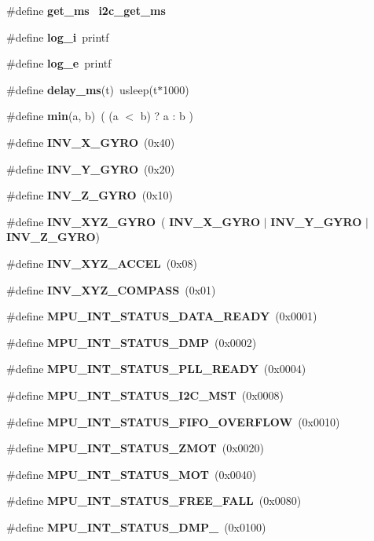 \begin{DoxyCompactItemize}
\item 
\#define \textbf{ get\+\_\+ms}~\textbf{ i2c\+\_\+get\+\_\+ms}
\item 
\#define \textbf{ log\+\_\+i}~printf
\item 
\#define \textbf{ log\+\_\+e}~printf
\item 
\#define \textbf{ delay\+\_\+ms}(t)~usleep(t$\ast$1000)
\item 
\#define \textbf{ min}(a,  b)~( (a $<$ b) ? a \+: b )
\item 
\#define \textbf{ I\+N\+V\+\_\+\+X\+\_\+\+G\+Y\+RO}~(0x40)
\item 
\#define \textbf{ I\+N\+V\+\_\+\+Y\+\_\+\+G\+Y\+RO}~(0x20)
\item 
\#define \textbf{ I\+N\+V\+\_\+\+Z\+\_\+\+G\+Y\+RO}~(0x10)
\item 
\#define \textbf{ I\+N\+V\+\_\+\+X\+Y\+Z\+\_\+\+G\+Y\+RO}~(\textbf{ I\+N\+V\+\_\+\+X\+\_\+\+G\+Y\+RO} $\vert$ \textbf{ I\+N\+V\+\_\+\+Y\+\_\+\+G\+Y\+RO} $\vert$ \textbf{ I\+N\+V\+\_\+\+Z\+\_\+\+G\+Y\+RO})
\item 
\#define \textbf{ I\+N\+V\+\_\+\+X\+Y\+Z\+\_\+\+A\+C\+C\+EL}~(0x08)
\item 
\#define \textbf{ I\+N\+V\+\_\+\+X\+Y\+Z\+\_\+\+C\+O\+M\+P\+A\+SS}~(0x01)
\item 
\#define \textbf{ M\+P\+U\+\_\+\+I\+N\+T\+\_\+\+S\+T\+A\+T\+U\+S\+\_\+\+D\+A\+T\+A\+\_\+\+R\+E\+A\+DY}~(0x0001)
\item 
\#define \textbf{ M\+P\+U\+\_\+\+I\+N\+T\+\_\+\+S\+T\+A\+T\+U\+S\+\_\+\+D\+MP}~(0x0002)
\item 
\#define \textbf{ M\+P\+U\+\_\+\+I\+N\+T\+\_\+\+S\+T\+A\+T\+U\+S\+\_\+\+P\+L\+L\+\_\+\+R\+E\+A\+DY}~(0x0004)
\item 
\#define \textbf{ M\+P\+U\+\_\+\+I\+N\+T\+\_\+\+S\+T\+A\+T\+U\+S\+\_\+\+I2\+C\+\_\+\+M\+ST}~(0x0008)
\item 
\#define \textbf{ M\+P\+U\+\_\+\+I\+N\+T\+\_\+\+S\+T\+A\+T\+U\+S\+\_\+\+F\+I\+F\+O\+\_\+\+O\+V\+E\+R\+F\+L\+OW}~(0x0010)
\item 
\#define \textbf{ M\+P\+U\+\_\+\+I\+N\+T\+\_\+\+S\+T\+A\+T\+U\+S\+\_\+\+Z\+M\+OT}~(0x0020)
\item 
\#define \textbf{ M\+P\+U\+\_\+\+I\+N\+T\+\_\+\+S\+T\+A\+T\+U\+S\+\_\+\+M\+OT}~(0x0040)
\item 
\#define \textbf{ M\+P\+U\+\_\+\+I\+N\+T\+\_\+\+S\+T\+A\+T\+U\+S\+\_\+\+F\+R\+E\+E\+\_\+\+F\+A\+LL}~(0x0080)
\item 
\#define \textbf{ M\+P\+U\+\_\+\+I\+N\+T\+\_\+\+S\+T\+A\+T\+U\+S\+\_\+\+D\+M\+P\+\_}~(0x0100)

\end{DoxyCompactItemize}
